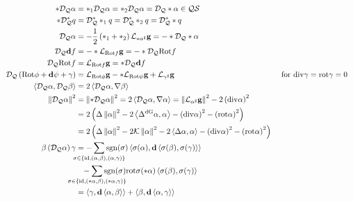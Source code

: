 \documentclass[a4paper,7pt]{scrartcl}
\newcommand{\surf}{\mathcal{S}}
\newcommand{\qts}{\mathcal{Q}\surf}
\newcommand{\gauss}{\mathcal{K}}
\newcommand{\exd}{\mathbf{d}}
\newcommand{\rot}{\mathrm{rot}}
\renewcommand{\div}{\mathrm{div}}
\newcommand{\Rot}{\mathrm{Rot}}
\newcommand{\lie}{\mathcal{L}}
\newcommand{\dq}{\mathcal{D}_{\mathcal{Q}}}
\newcommand{\sgn}{\mathrm{sgn}}
\newcommand{\laplace}[1]{\Delta^{#1}}
\newcommand{\ldivgrad}{\laplace{\textup{dG}}}
\newcommand{\gb}{\mathbf{g}}
\begin{document}
  \begin{align*}
    *\dq\alpha &= *_{1}\dq\alpha = *_{2}\dq\alpha = \dq*\alpha \in \qts \\
    *\dq^{*} q &= \dq^{*} *_{1} q =  \dq^{*} *_{2} q = \dq^{*} * q\\
    \dq\alpha &= -\frac{1}{2}\left( *_{1} + *_{2} \right)\lie_{*\alpha^{\sharp}}\gb = -*\dq*\alpha\\
    \dq\exd f &= -*\lie_{\Rot f}\gb = -*\dq\Rot f \\
    \dq\Rot f &= \lie_{\Rot f}\gb = *\dq\exd f\\
    \dq\left( \Rot \phi + \exd\psi + \gamma \right) &= \lie_{\Rot \phi}\gb - *\lie_{\Rot \psi}\gb + \lie_{\gamma^{\sharp}}\gb
              &&\text{ for }\div\gamma=\rot\gamma=0 \\
    \left\langle \dq\alpha , \dq\beta \right\rangle &= 2\left\langle \dq\alpha , \nabla\beta \right\rangle\\
    \left\| \dq\alpha \right\|^{2} &= \left\| *\dq\alpha \right\|^{2} 
                                  = 2\left\langle \dq\alpha , \nabla\alpha \right\rangle
                                  = \left\| \lie_{\alpha^{\sharp}}\gb \right\|^{2} - 2\left( \div\alpha \right)^{2}\\
                    &= 2\left( \Delta\left\| \alpha \right\|^{2} - 2\left\langle \ldivgrad\alpha , \alpha \right\rangle 
                                  -\left( \div\alpha \right)^{2} - \left( \rot\alpha \right)^{2}\right)\\
                    &= 2\left( \Delta\left\| \alpha \right\|^{2} -2\gauss\left\| \alpha \right\|^{2} - 2\left\langle \Delta\alpha , \alpha \right\rangle 
                                  -\left( \div\alpha \right)^{2} - \left( \rot\alpha \right)^{2}\right)\\
    \beta\left( \dq\alpha \right)\gamma
          &= -\sum_{\mathclap{\sigma\in\left\{ \textup{id}, \left( \alpha,\beta \right), \left( \alpha,\gamma \right) \right\}}}
                    \sgn(\sigma)\left\langle \sigma(\alpha),\exd\left\langle \sigma(\beta),\sigma(\gamma) \right\rangle \right\rangle\\
          &\hphantom{=}  -\sum_{\mathclap{\sigma\in\left\{ \textup{id}, \left( *\alpha,\beta \right), \left( *\alpha,\gamma \right) \right\}}}
                     \sgn(\sigma) \rot\sigma(*\alpha)\left\langle \sigma(\beta) , \sigma(\gamma) \right\rangle\\
          &= \left\langle \gamma,\exd\left\langle \alpha,\beta \right\rangle \right\rangle
             +\left\langle \beta,\exd\left\langle \alpha,\gamma \right\rangle \right\rangle

\end{align*}
\end{document}
